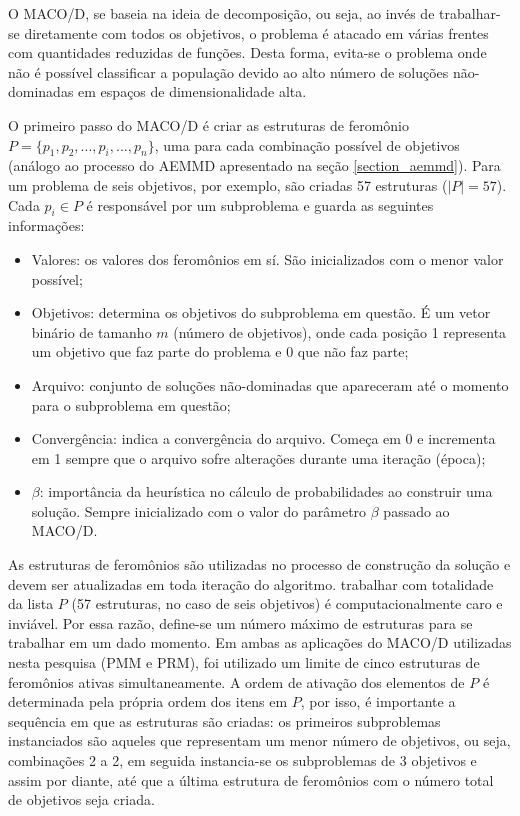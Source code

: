 O MACO/D, se baseia na ideia de decomposição, ou seja, ao invés de trabalhar-se diretamente com todos os objetivos, o problema é atacado em várias frentes com quantidades reduzidas de funções. Desta forma, evita-se o problema onde não é possível classificar a população devido ao alto número de soluções não-dominadas em espaços de dimensionalidade alta.

O primeiro passo do MACO/D é criar as estruturas de feromônio $P = \{p_1, p_2, ..., p_i, ..., p_n\}$, uma para cada combinação possível de objetivos (análogo ao processo do AEMMD apresentado na seção \ref{section_aemmd}). Para um problema de seis objetivos, por exemplo, são criadas 57 estruturas ($|P| = 57$). Cada $p_i \in P$ é responsável por um subproblema e guarda as seguintes informações:

\begin{itemize}
	\item Valores: os valores dos feromônios em sí. São inicializados com o menor valor possível;
	\item Objetivos: determina os objetivos do subproblema em questão. É um vetor binário de tamanho $m$ (número de objetivos), onde cada posição 1 representa um objetivo que faz parte do problema e 0 que não faz parte;
	\item Arquivo: conjunto de soluções não-dominadas que apareceram até o momento para o subproblema em questão;
	\item Convergência: indica a convergência do arquivo. Começa em 0 e incrementa em 1 sempre que o arquivo sofre alterações durante uma iteração (época);
	\item $\beta$: importância da heurística no cálculo de probabilidades ao construir uma solução. Sempre inicializado com o valor do parâmetro $\beta$ passado ao MACO/D.
\end{itemize}

As estruturas de feromônios são utilizadas no processo de construção da solução e devem ser atualizadas em toda iteração do algoritmo. trabalhar com totalidade da lista $P$ (57 estruturas, no caso de seis objetivos) é computacionalmente caro e inviável. Por essa razão, define-se um número máximo de estruturas para se trabalhar em um dado momento. Em ambas as aplicações do MACO/D utilizadas nesta pesquisa (PMM e PRM), foi utilizado um limite de cinco estruturas de feromônios ativas simultaneamente. A ordem de ativação dos elementos de $P$ é determinada pela própria ordem dos itens em $P$, por isso, é importante a sequência em que as estruturas são criadas: os primeiros subproblemas instanciados são aqueles que representam um menor número de  objetivos, ou seja, combinações 2 a 2, em seguida instancia-se os subproblemas de 3 objetivos e assim por diante, até que a última estrutura de feromônios com o número total de objetivos seja criada.


